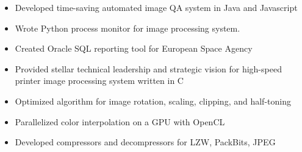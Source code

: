 \documentclass[10pt,a4paper,ragged2e,withhyper]{altacv}
\begin{document}
\begin{paracol}{2}
\divider


\begin{itemize}
\item Developed time-saving automated image QA system in Java and Javascript
\item Wrote Python process monitor for image processing system.
\item Created Oracle SQL reporting tool for European Space Agency
\end{itemize}

\divider


\begin{itemize}
\item Provided stellar technical leadership and strategic vision for high-speed printer image processing system written in C
\item Optimized algorithm for image rotation, scaling, clipping, and half-toning
\item Parallelized color interpolation on a GPU with OpenCL
\item Developed compressors and decompressors for LZW, PackBits, JPEG
\end{itemize}

\newpage

\switchcolumn



\divider




\divider


\divider


\divider


\end{paracol}
\end{document}
